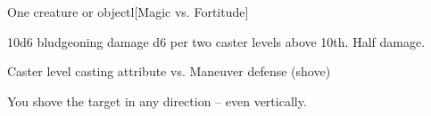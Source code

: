 \spellrng{\rngmed}
\begin{spelltarget}{One creature or object}l[Magic vs. Fortitude]
    \begin{spellmargin}
        \spellsuccess 10d6 bludgeoning damage \add d6 per two caster levels above 10th.
        \spellfailure Half damage.
    \end{spellmargin}
    \spellattack Caster level \add casting attribute  vs. Maneuver defense (shove)
    \begin{spellmargin}
        \spellsuccess You shove the target in any direction -- even vertically.
    \end{spellmargin}
\end{spelltarget}

